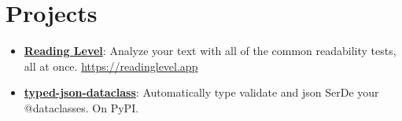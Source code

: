 \documentclass[letterpaper,11pt]{article}
\newcommand{\resumeItem}[2]{
  \item\small{
    \textbf{#1}{: #2 \vspace{-2pt}}
  }
}
\newcommand{\resumeSubItem}[2]{\resumeItem{#1}{#2}\vspace{-4pt}}
\newcommand{\resumeSubHeadingListStart}{\begin{itemize}[leftmargin=*]}
\newcommand{\resumeSubHeadingListEnd}{\end{itemize}}
\begin{document}
\section{Projects}
  \resumeSubHeadingListStart
  \resumeSubItem{\href{https://www.readinglevel.app}{Reading Level}}
    {Analyze your text with all of the common readability tests, all at once.
      \href{https://www.readinglevel.app}{https://readinglevel.app}}
  \resumeSubItem{\href{https://pypi.org/project/typed-json-dataclass/1.2.1/}{typed-json-dataclass}}
    {Automatically type validate and json SerDe your @dataclasses. On PyPI.}
  \resumeSubHeadingListEnd
\end{document}
